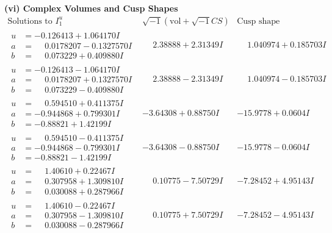 \documentclass[1p]{elsarticle_modified}
\theoremstyle{definition}
\newcommand{\I}{\sqrt{-1}}
\begin{document}
\newpage\flushleft \textbf{(vi) Complex Volumes and Cusp Shapes}
$$\begin{array}{c|c|c}  
\text{Solutions to }I^u_{1}& \I (\text{vol} + \sqrt{-1}CS) & \text{Cusp shape}\\
 \hline 
\begin{aligned}
u &= -0.126413 + 1.064170 I \\
a &= \phantom{-}0.0178207 - 0.1327570 I \\
b &= \phantom{-}0.073229 + 0.409880 I\end{aligned}
 & \phantom{-}2.38888 + 2.31349 I & \phantom{-}1.040974 + 0.185703 I \\ \hline\begin{aligned}
u &= -0.126413 - 1.064170 I \\
a &= \phantom{-}0.0178207 + 0.1327570 I \\
b &= \phantom{-}0.073229 - 0.409880 I\end{aligned}
 & \phantom{-}2.38888 - 2.31349 I & \phantom{-}1.040974 - 0.185703 I \\ \hline\begin{aligned}
u &= \phantom{-}0.594510 + 0.411375 I \\
a &= -0.944868 + 0.799301 I \\
b &= -0.88821 + 1.42199 I\end{aligned}
 & -3.64308 + 0.88750 I & -15.9778 + 0.0604 I \\ \hline\begin{aligned}
u &= \phantom{-}0.594510 - 0.411375 I \\
a &= -0.944868 - 0.799301 I \\
b &= -0.88821 - 1.42199 I\end{aligned}
 & -3.64308 - 0.88750 I & -15.9778 - 0.0604 I \\ \hline\begin{aligned}
u &= \phantom{-}1.40610 + 0.22467 I \\
a &= \phantom{-}0.307958 + 1.309810 I \\
b &= \phantom{-}0.030088 + 0.287966 I\end{aligned}
 & \phantom{-}0.10775 - 7.50729 I & -7.28452 + 4.95143 I \\ \hline\begin{aligned}
u &= \phantom{-}1.40610 - 0.22467 I \\
a &= \phantom{-}0.307958 - 1.309810 I \\
b &= \phantom{-}0.030088 - 0.287966 I\end{aligned}
 & \phantom{-}0.10775 + 7.50729 I & -7.28452 - 4.95143 I \\ \hline\begin{aligned}

\end{aligned}
\end{array}$$
\end{document}
